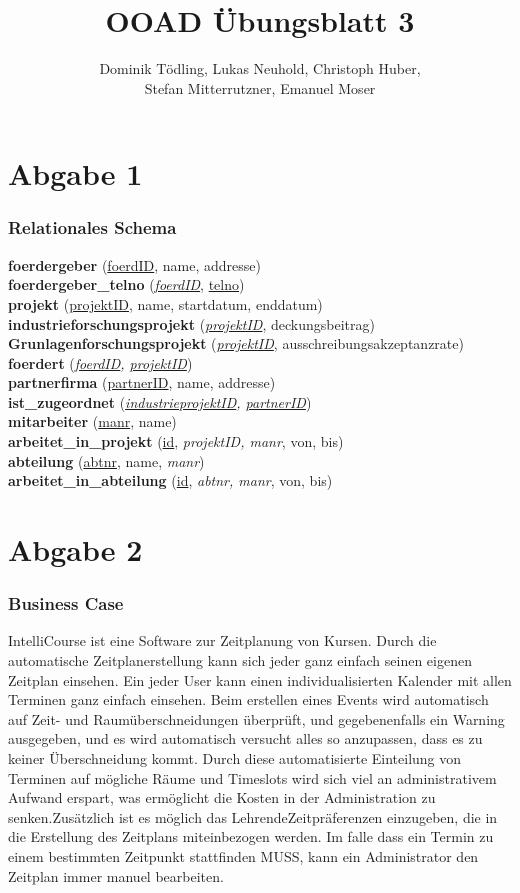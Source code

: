 \documentclass[a4paper,12pt]{article}
\title{OOAD Übungsblatt 3}
\author{Dominik Tödling, Lukas Neuhold, Christoph Huber,\\ Stefan Mitterrutzner, Emanuel Moser}
\begin{document}
\maketitle
\newpage
\part*{Abgabe 1}
\section*{Relationales Schema}
\textbf{foerdergeber} (\underline{foerdID}, name, addresse)\\
\textbf{foerdergeber\_telno} (\textit{\underline{foerdID}}, \underline{telno})\\
\textbf{projekt} (\underline{projektID}, name, startdatum, enddatum)\\
\textbf{industrieforschungsprojekt} (\textit{\underline{projektID}}, deckungsbeitrag)\\
\textbf{Grunlagenforschungsprojekt} (\textit{\underline{projektID}}, ausschreibungsakzeptanzrate)\\
\textbf{foerdert} (\textit{\underline{foerdID}, \underline{projektID}})\\
\textbf{partnerfirma} (\underline{partnerID}, name, addresse)\\
\textbf{ist\_zugeordnet} (\textit{\underline{industrieprojektID}, \underline{partnerID}}) \\
\textbf{mitarbeiter} (\underline{manr}, name)\\
\textbf{arbeitet\_in\_projekt} (\underline{id}, \textit{projektID, manr}, von, bis) \\
\textbf{abteilung} (\underline{abtnr}, name, \textit{manr}) \\
\textbf{arbeitet\_in\_abteilung} (\underline{id}, \textit{abtnr, manr}, von, bis) \\
\newpage
\part*{Abgabe 2}
\section*{Business Case}
IntelliCourse ist eine Software zur Zeitplanung von Kursen. Durch die automatische Zeitplanerstellung kann sich jeder ganz einfach seinen eigenen Zeitplan einsehen. Ein jeder User kann einen individualisierten Kalender mit allen Terminen ganz einfach einsehen.  Beim erstellen eines Events wird automatisch auf Zeit- und Raumüberschneidungen überprüft, und gegebenenfalls ein Warning ausgegeben, und es wird automatisch versucht alles so anzupassen, dass es zu keiner Überschneidung kommt. Durch diese automatisierte Einteilung von Terminen auf mögliche Räume und Timeslots wird sich viel an administrativem Aufwand erspart, was ermöglicht die Kosten in der Administration zu senken.Zusätzlich ist es möglich das  LehrendeZeitpräferenzen einzugeben, die in die Erstellung des Zeitplans miteinbezogen werden. Im falle dass ein Termin zu einem bestimmten Zeitpunkt stattfinden MUSS, kann ein Administrator den Zeitplan immer manuel bearbeiten.
\end{document}
